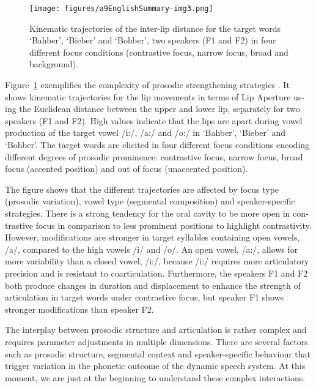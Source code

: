 \begin{otherlanguage}{english}
\begin{figure}[b]
	\texttt{[image: figures/a9EnglishSummary-img3.png]}
	\caption{Kinematic trajectories of the inter-lip distance for the target words ‘Bahber’, ‘Bieber’ and ‘Bohber’, two speakers (F1 and F2) in four different focus conditions (contrastive focus, narrow focus, broad and background).}
	\label{fig:0803}
\end{figure}

Figure~\ref{fig:0803} exemplifies the complexity of prosodic strengthening strategies \citep[a\-dap\-ted from][]{Mücke2014b}. It shows kinematic trajectories for the lip movements in terms of Lip Aperture using the Euclidean distance between the upper and lower lip, separately for two speakers (F1 and F2). High values indicate that the lips are apart during vowel production of the target vowel /i:/, /a:/ and /o:/ in ‘Bahber’, ‘Bieber’ and ‘Bohber’. The target words are elicited in four different focus conditions encoding different degrees of prosodic prominence: contrastive focus, narrow focus, broad focus (accented position) and out of focus (unaccented position).

The figure shows that the different trajectories are affected by focus type (pro\-so\-dic variation), vowel type (segmental composition) and speaker-specific strategies. There is a strong tendency for the oral cavity to be more open in contrastive focus in comparison to less prominent positions to highlight contrastivity. However, modifications are stronger in target syllables containing open vowels, /a/, compared to the high vowels /i/ and /o/. An open vowel, /a:/, allows for more variability than a closed vowel, /i:/, because /i:/ requires more articulatory precision and is resistant to coarticulation. Furthermore, the speakers F1 and F2 both produce changes in duration and displacement to enhance the strength of articulation in target words under contrastive focus, but speaker F1 shows stronger modifications than speaker F2. 

The interplay between prosodic structure and articulation is rather complex and requires parameter adjustments in multiple dimensions. There are several factors such as prosodic structure, segmental context and speaker-specific behaviour that trigger variation in the phonetic outcome of the dynamic speech system. At this moment, we are just at the beginning to understand these complex interactions.
\end{otherlanguage}